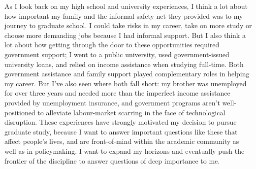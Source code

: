 \documentclass[11pt]{article}
\begin{document}


As I look back on my high school and university experiences, I think a lot about how important my family and the informal safety net they provided was to my journey to graduate school. I could take risks in my career, take on more study or choose more demanding jobs because I had informal support. But I also think a lot about how getting through the door to these opportunities required government support; I went to a public university, used government-issued university loans, and relied on income assistance when studying full-time. Both government assistance and family support played complementary roles in helping my career.
\psbreak
But I've also seen where both fall short: my brother was unemployed for over three years and needed more than the imperfect income assistance provided by unemployment insurance, and government programs aren't well-positioned to alleviate labour-market scarring in the face of technological disruption.
\psbreak
These experiences have strongly motivated my decision to pursue graduate study, because I want to answer important questions like these that affect people's lives, and are front-of-mind within the academic community as well as in policymaking. I want to expand my horizons and eventually push the frontier of the discipline to answer questions of deep importance to me.


\end{document}
